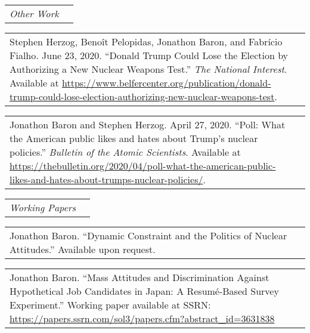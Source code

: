 \documentclass[11pt]{article}
\begin{document}
\vspace{0.13in}

\begin{tabular*}{7.1in}{p{6.925in}p{3cm}}
{\large {\emph{Other Work}}}
\end{tabular*} 
	
\vspace{0.13in}

\begin{tabular*}{7.1in}{p{6.925in}p{3cm}}
Stephen Herzog, Beno\^{i}t Pelopidas, Jonathon Baron, and Fabrício Fialho. June 23, 2020. ``Donald Trump Could Lose the Election by Authorizing a New Nuclear Weapons Test.'' \textit{The National Interest}. Available at \url{https://www.belfercenter.org/publication/donald-trump-could-lose-election-authorizing-new-nuclear-weapons-test}.
\end{tabular*}

\vspace{0.13in}

\begin{tabular*}{7.1in}{p{6.925in}p{3cm}}
Jonathon Baron and Stephen Herzog. April 27, 2020. ``Poll: What the American public likes and hates about Trump's nuclear policies.'' \textit{Bulletin of the Atomic Scientists}. Available at \url{https://thebulletin.org/2020/04/poll-what-the-american-public-likes-and-hates-about-trumps-nuclear-policies/}.
\end{tabular*}

\vspace{0.13in}

\begin{tabular*}{7.1in}{p{6.925in}p{3cm}}
{\large {\emph{Working Papers}}}
\end{tabular*} 

\vspace{0.13in}
\begin{tabular*}{7.1in}{p{6.925in}p{3cm}}
Jonathon Baron. ``Dynamic Constraint and the Politics of Nuclear Attitudes.'' Available upon request.
\end{tabular*}

\vspace{0.13in}

\begin{tabular*}{7.1in}{p{6.925in}p{3cm}}
Jonathon Baron. ``Mass Attitudes and Discrimination Against Hypothetical Job Candidates in Japan: A Resum\'{e}-Based Survey Experiment.'' Working paper available at SSRN: \url{https://papers.ssrn.com/sol3/papers.cfm?abstract_id=3631838}
\end{tabular*}
\end{document}
